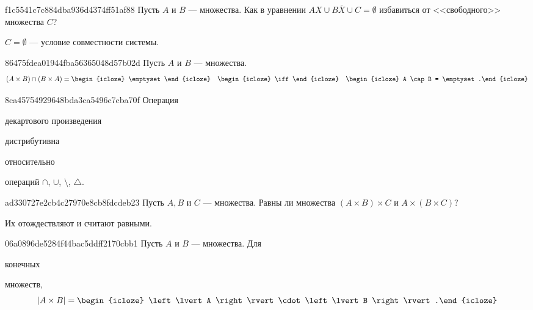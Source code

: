 \begin{note}{f1c5541c7c884dba936d4374ff51af88}
    Пусть \({ A }\) и \({ B }\) --- множества. Как в уравнении \({ AX \cup B \overline{X} \cup C = \emptyset }\) избавиться от <<свободного>> множества \({ C }\)?

    \begin{cloze}{1}
        \({ C = \emptyset }\) --- условие совместности системы.
    \end{cloze}
\end{note}

\begin{note}{86475fdea01944fba56365048d57b02d}
    Пусть \({ A }\) и \({ B }\) --- множества.
    \[
        (A \times B) \cap (B \times A) = \begin{icloze}{2}\emptyset\end{icloze} \quad \begin{icloze}{3}\iff\end{icloze} \quad \begin{icloze}{1}A \cap B = \emptyset.\end{icloze}
    \]
\end{note}

\begin{note}{8ca45754929648bda3ca5496c7cba70f}
    Операция \begin{icloze}{3}декартового произведения\end{icloze} \begin{icloze}{2}дистрибутивна\end{icloze} относительно \begin{icloze}{1}операций \({ \cap }\), \({ \cup }\), \({ \setminus }\), \({ \bigtriangleup }\).\end{icloze}
\end{note}

\begin{note}{ad330727e2cb4c27970e8cb8fdcdeb23}
    Пусть \({ A, B }\) и \({ C }\) --- множества.
    Равны ли множества \({ (A \times B) \times C }\) и \({ A \times (B \times C) }\)?

    \begin{cloze}{1}
        Их отождествляют и считают равными.
    \end{cloze}
\end{note}

\begin{note}{06a0896de5284f44bac5ddff2170cbb1}
    Пусть \({ A }\) и \({ B }\) --- множества. Для \begin{icloze}{2}конечных\end{icloze} множеств,
    \[
        \left\lvert A \times B \right\rvert = \begin{icloze}{1}\left\lvert A \right\rvert \cdot \left\lvert B \right\rvert.\end{icloze}
    \]
\end{note}

